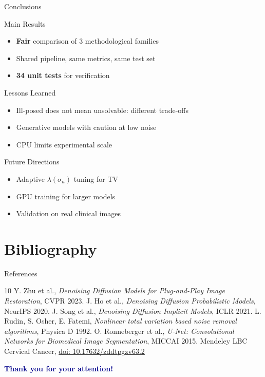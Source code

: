 \documentclass[english,10pt]{beamer}
\begin{document}
\begin{frame}{Conclusions}
  \begin{block}{Main Results}
    \begin{itemize}
      \item \textbf{Fair} comparison of 3 methodological families
      \item Shared pipeline, same metrics, same test set
      \item \textbf{34 unit tests} for verification
    \end{itemize}
  \end{block}
  \begin{block}{Lessons Learned}
    \begin{itemize}
      \item Ill-posed does not mean unsolvable: different trade-offs
      \item Generative models with caution at low noise
      \item CPU limits experimental scale
    \end{itemize}
  \end{block}
  \begin{block}{Future Directions}
    \begin{itemize}
      \item Adaptive $\lambda(\sigma_n)$ tuning for TV
      \item GPU training for larger models
      \item Validation on real clinical images
    \end{itemize}
  \end{block}
\end{frame}

\section{Bibliography}

\begin{frame}{References}
  \footnotesize
  \begin{thebibliography}{10}
     Y. Zhu et al., \emph{Denoising Diffusion Models for Plug-and-Play Image Restoration}, CVPR 2023.
     J. Ho et al., \emph{Denoising Diffusion Probabilistic Models}, NeurIPS 2020.
     J. Song et al., \emph{Denoising Diffusion Implicit Models}, ICLR 2021.
     L. Rudin, S. Osher, E. Fatemi, \emph{Nonlinear total variation based noise removal algorithms}, Physica D 1992.
     O. Ronneberger et al., \emph{U-Net: Convolutional Networks for Biomedical Image Segmentation}, MICCAI 2015.
     Mendeley LBC Cervical Cancer, \href{https://data.mendeley.com/datasets/zddtpgzv63/2}{doi: 10.17632/zddtpgzv63.2}
  \end{thebibliography}
  \vspace{0.5cm}
  \begin{center}
    \Large\textcolor{darkblue}{\textbf{Thank you for your attention!}}
  \end{center}
\end{frame}
\end{document}
